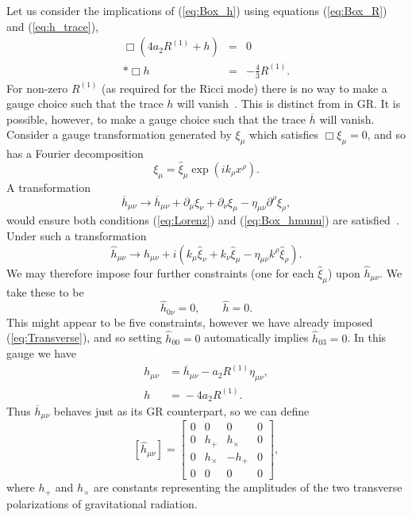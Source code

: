 \documentclass[aps,prd,amsfonts,amssymb,amsmath,nofootinbib,reprint,showpacs]{revtex4-1}
\newcommand{\eqnref}[1]{(\ref{eq:#1})}
\begin{document}
Let us consider the implications of \eqnref{Box_h} using equations \eqnref{Box_R} and \eqnref{h_trace},
\begin{eqnarray}
\Box\left(4a_2R^{(1)} + h\right) & = & 0 \nonumber \\*
\Box h & = & -\frac{4}{3}R^{(1)}.
\end{eqnarray}
For non-zero $R^{(1)}$ (as required for the Ricci mode) there is no way to make a gauge choice such that the trace $h$ will vanish~\cite{Corda2007, Capozziello2008}. This is distinct from in GR. It is possible, however, to make a gauge choice such that the trace $\overline{h}$ will vanish. Consider a gauge transformation generated by $\xi_\mu$ which satisfies $\Box \xi_\mu = 0$, and so has a Fourier decomposition
\begin{equation}
\xi_\mu = \widehat{\xi}_\mu \exp\left(ik_\rho x^\rho\right).
\end{equation}
A transformation
\begin{equation}
\overline{h}_{\mu\nu} \rightarrow \overline{h}_{\mu\nu} + \partial_\mu\xi_\nu + \partial_\nu\xi_\mu - \eta_{\mu\nu}\partial^\rho\xi_\rho,
\end{equation}
would ensure both conditions \eqnref{Lorenz} and \eqnref{Box_hmunu} are satisfied~\cite{Misner1973}. Under such a transformation
\begin{equation}
\widehat{h}_{\mu\nu} \rightarrow \widehat{h}_{\mu\nu} + i\left(k_\mu\widehat{\xi}_\nu + k_\nu\widehat{\xi}_\mu - \eta_{\mu\nu}k^\rho\widehat{\xi}_\rho\right).
\end{equation}
We may therefore impose four further constraints (one for each $\widehat{\xi}_\mu$) upon $\widehat{h}_{\mu\nu}$. We take these to be
\begin{equation}
\widehat{h}_{0\nu} = 0, \qquad \widehat{h} = 0.
\end{equation}
This might appear to be five constraints, however we have already imposed \eqnref{Transverse}, and so setting $\widehat{h}_{00} = 0$ automatically implies $\widehat{h}_{03} = 0$. In this gauge we have
\begin{equation}
\begin{split}
h_{\mu\nu} & = {} \overline{h}_{\mu\nu} - a_2 R^{(1)}\eta_{\mu\nu},\\
h & = {} -4a_2R^{(1)}.
\end{split}
\label{eq:gauge}
\end{equation}
Thus $\overline{h}_{\mu\nu}$ behaves just as its GR counterpart, so we can define
\begin{equation}
\left[\widehat{h}_{\mu\nu}\right] =
\begin{bmatrix}
0 & 0 & 0 & 0\\
0 & h_+ & h_\times & 0\\
0 & h_\times & -h_+ & 0\\
0 & 0 & 0 & 0
\end{bmatrix},
\end{equation}
where $h_+$ and $h_\times$ are constants representing the amplitudes of the two transverse polarizations of gravitational radiation.
\end{document}
